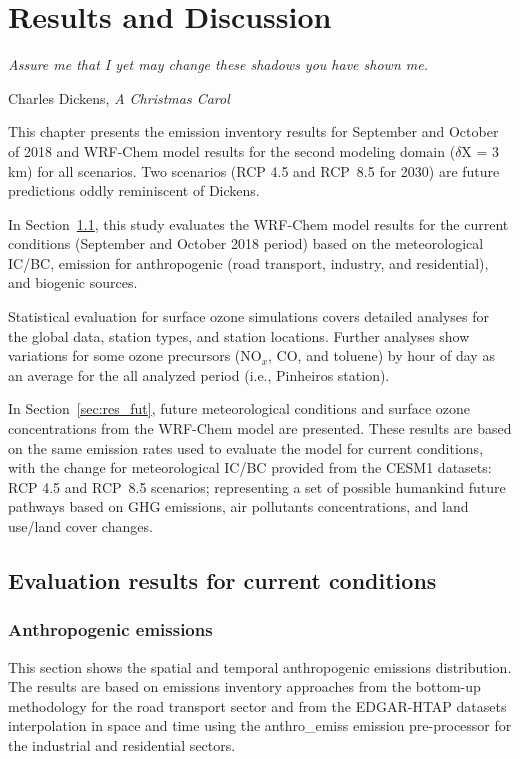 \chapter{\bf Results and Discussion}\label{chap:resul}
\epigraph{\textit{Assure me that I yet may change these shadows you have shown me.}}{Charles Dickens, \textit{A Christmas Carol}}
   \noindent  This chapter presents the emission inventory results for September and October of 2018 and WRF-Chem model results for the second modeling domain ($\delta$X = 3 km) for all scenarios.
   Two scenarios (RCP 4.5 and RCP~8.5 for 2030) are future predictions oddly reminiscent of Dickens.
      
   In Section~\ref{sec:res_curr}, this study evaluates the WRF-Chem model results for the current conditions (September and October 2018 period) based on the meteorological IC/BC, emission for anthropogenic (road transport, industry, and residential), and biogenic sources.
   
   Statistical evaluation for surface ozone simulations covers detailed analyses for the global data, station types, and station locations.
   Further analyses show variations for some ozone precursors (NO$_x$, CO, and toluene) by hour of day as an average for the all analyzed period (i.e., Pinheiros station).
   
   In Section~\ref{sec:res_fut}, future meteorological conditions and surface ozone concentrations from the WRF-Chem model are presented. 
   These results are based on the same emission rates used to evaluate the model for current conditions, with the change for meteorological IC/BC provided from the CESM1 datasets: RCP 4.5 and RCP~8.5 scenarios; representing a set of possible humankind future pathways based on GHG emissions, air pollutants concentrations, and land use/land cover changes.   
   
   \section{Evaluation results for current conditions}\label{sec:res_curr}
    
  \subsection{Anthropogenic emissions}\label{subsec:res_anth}
   This section shows the spatial and temporal anthropogenic emissions distribution.
   The results are based on emissions inventory approaches from the bottom-up methodology for the road transport sector \citep{Andrade2015} and from the EDGAR-HTAP datasets \citep{Janssens2015} interpolation in space and time using the anthro\_emiss emission pre-processor \citep{Kumar2020} for the industrial and residential sectors.
   
